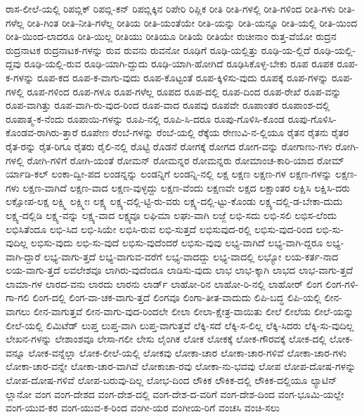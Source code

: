 {ರಾಸ-ಲೀಲೆ-ಯಲ್ಲಿ
ರಿಪಬ್ಲಿಕ್
ರಿಪಬ್ಲಿ-ಕನ್
ರಿಪಬ್ಲಿಕ್ಕಿನ
ರಿಪೇರಿ
ರಿಪ್ಲಿಕ
ರೀತಿ
ರೀತಿ-ಗಳಲ್ಲಿ
ರೀತಿ-ಗಳಿಂದ
ರೀತಿ-ಗಳು
ರೀತಿ-ಗಳೆಲ್ಲ
ರೀತಿ-ಗಿಂತ
ರೀತಿ-ನೀತಿ-ಗಳೆಲ್ಲ
ರೀತಿಯ
ರೀತಿ-ಯಂತೆಯೇ
ರೀತಿ-ಯನ್ನು
ರೀತಿ-ಯನ್ನೂ
ರೀತಿ-ಯಲ್ಲಿ
ರೀತಿ-ಯಿಂದ
ರೀತಿ-ಯಿಂದ-ಲಾದರೂ
ರೀತಿ-ಯಿಲ್ಲ
ರೀತಿಯು
ರೀತಿಯೂ
ರೀತಿಯೆ
ರೀತಿಯೇ
ರುಚೀನಾಂ
ರುತ್ತ-ವೆಯೋ
ರುದ್ರನ
ರುದ್ರನಾಟಕ
ರುದ್ರನಾಟಕ-ಗಳನ್ನು
ರುವ
ರುವನು
ರುವನೋ
ರೂಢಿಗೆ
ರೂಢಿ-ಯಲ್ಲಿತ್ತು
ರೂಢಿ-ಯ-ಲ್ಲಿದೆ
ರೂಢಿ-ಯಲ್ಲಿ-ದ್ದವು
ರೂಢಿ-ಯಲ್ಲಿ-ರುವ
ರೂಢಿ-ಯಾಗಿ-ದ್ದುದು
ರೂಢಿ-ಯಾಗಿ-ಹೋಗಿದೆ
ರೂಢಿಸಿಕೊಳ್ಳ-ಬೇಕು
ರೂಪ
ರೂಪಕ
ರೂಪ-ಕ-ಗಳನ್ನು
ರೂಪ-ಕದ
ರೂಪ-ಕ-ವಾಗು-ವುದು
ರೂಪ-ಕೊಟ್ಟಂತೆ
ರೂಪ-ಕ್ಕಿಳಿಸು-ವುದು
ರೂಪಕ್ಕೆ
ರೂಪ-ಗಳನ್ನು
ರೂಪ-ಗಳಲ್ಲಿ
ರೂಪ-ಗಳಿಂದ
ರೂಪ-ಗಳೂ
ರೂಪ-ಗಳೆಲ್ಲ
ರೂಪದ
ರೂಪ-ದಲ್ಲಿ
ರೂಪ-ದಿಂದ
ರೂಪ-ರೇಖೆ
ರೂಪ-ವನ್ನು
ರೂಪ-ವಾಗಿತ್ತು
ರೂಪ-ವಾಗಿ-ರು-ವುದ-ರಿಂದ
ರೂಪ-ವಾದ
ರೂಪವು
ರೂಪವೇ
ರೂಪಾಂತರ
ರೂಪಾಂಶ-ದಲ್ಲಿ
ರೂಪಾತ್ಮ-ಕ-ನೆಂದು
ರೂಪಾಯಿ-ಗಳನ್ನು
ರೂಪಿ-ನಲ್ಲಿ
ರೂಪಿ-ಸಿ-ದರೂ
ರೂಪು-ಗೊಳಿಸಿ-ಕೊಂಡ
ರೂಪು-ಗೊಳಿಸಿ-ಕೊಂಡವ-ರಾಗಿರು-ತ್ತಾರೆ
ರೂಪೇಣ
ರೆಂಬೆ-ಗಳನ್ನು
ರೆಂಬೆ-ಯಲ್ಲಿ
ರೆಕ್ಕೆಯ
ರೇಣುವಿ-ನ-ಲ್ಲಿಯೂ
ರೈತನ
ರೈತನು
ರೈತರ
ರೈತ-ರನ್ನು
ರೈತ-ರಿಗೂ
ರೈತರು
ರೈಲಿ-ನಲ್ಲಿ
ರೊಟ್ಟಿ
ರೊಡನೆ
ರೋಗಕ್ಕೆ
ರೋಗದ
ರೋಗ-ವನ್ನು
ರೋಗಾಣು-ಗಳು
ರೋಗಿ-ಗಳಲ್ಲಿ
ರೋಗಿ-ಗಳಿಗೆ
ರೋಗಿ-ಯಂತೆ
ರೋಮನ್
ರೋಮನ್ನರ
ರೋಮನ್ನರು
ರೋಮಾಂಚ-ಕಾರಿ-ಯಾದ
ರೋಮ್
ರ್ಯಾಡಿ-ಕಲ್
ಲಂಕಾ-ದ್ವೀ-ಪದ
ಲಂಡನ್ನನ್ನು
ಲಂಡನ್ನಿಗೆ
ಲಂಡನ್ನಿ-ನಲ್ಲಿ
ಲಕ್ಷ
ಲಕ್ಷಣ
ಲಕ್ಷಣ-ಗಳ
ಲಕ್ಷಣ-ಗಳನ್ನು
ಲಕ್ಷಣ-ಗಳು
ಲಕ್ಷಣ-ವಾಗಿದೆ
ಲಕ್ಷಣ-ವಾದ
ಲಕ್ಷಣ-ವುಳ್ಳದ್ದು
ಲಕ್ಷಣ-ವೆಂದು
ಲಕ್ಷಣವೇ
ಲಕ್ಷದ
ಲಕ್ಷಾಂತರ
ಲಕ್ಷಿಸಿ
ಲಕ್ಷಿಸಿ-ದರು
ಲಕ್ಷೋಪ-ಲಕ್ಷ
ಲಕ್ಷ್ಮಿ
ಲಕ್ಷ್ಮೀಃ
ಲಕ್ಷ್ಯ
ಲಕ್ಷ್ಯ-ದಲ್ಲಿ-ಟ್ಟಿ-ರು-ವರು
ಲಕ್ಷ್ಯ-ದಲ್ಲಿ-ಟ್ಟು-ಕೊಂಡು
ಲಕ್ಷ್ಯ-ದಲ್ಲಿ-ಡ-ಬೇಕಾ-ದುದು
ಲಕ್ಷ್ಯ-ದಲ್ಲಿಡಿ
ಲಕ್ಷ್ಯ-ವನ್ನು
ಲಕ್ಷ್ಯ-ವಾದ
ಲಕ್ಷ್ಯವೂ
ಲಘಿಮಾ
ಲಘು-ವಾಗಿ
ಲಜ್ಜೆ
ಲಭಿ-ಸದು
ಲಭಿ-ಸಲಿ
ಲಭಿಸ-ಲೆಂದು
ಲಭಿಸಿತೆಂದೂ
ಲಭಿ-ಸಿದ
ಲಭಿ-ಸಿಯೇ
ಲಭಿಸಿ-ರುವ
ಲಭಿ-ಸುತ್ತದೆ
ಲಭಿಸುವುದ-ರಲ್ಲಿ
ಲಭಿಸು-ವುದ-ರಿಂದ
ಲಭಿ-ಸು-ವುದಿಲ್ಲ
ಲಭಿಸು-ವುದು
ಲಭಿ-ಸು-ವುದೆ
ಲಭಿಸು-ವುದೆಂದರೆ
ಲಭಿಸು-ವುವು
ಲಭ್ಯ-ವಾಗಿದೆ
ಲಭ್ಯ-ವಾಗಿ-ದ್ದರೂ
ಲಭ್ಯ-ವಾಗಿ-ದ್ದಾರೆ
ಲಭ್ಯ-ವಾಗು-ತ್ತದೆ
ಲಭ್ಯ-ವಾಗುವ-ವರೆಗೆ
ಲಭ್ಯ-ವಾದದ್ದು
ಲಭ್ಯ-ವಾದಲ್ಲಿ
ಲಭ್ಯೋ
ಲಯ-ಕರ್ತ-ನಾದ
ಲಯ-ವಾಗು-ತ್ತದೆ
ಲವಲೇಶವೂ
ಲಾಗಿರು-ವುದೆಂದೂ
ಲಾಡಿಸು-ವುದು
ಲಾಭ
ಲಾಭ-ಕ್ಕಾಗಿ
ಲಾಭದ
ಲಾಭ-ವಾಗು-ತ್ತದೆ
ಲಾಮಾ-ಗಳ
ಲಾರದ-ವನು
ಲಾರದು
ಲಾರನು
ಲಾರ್ಡ್
ಲಾಹೋ-ರಿನ
ಲಾಹೋ-ರಿ-ನಲ್ಲಿ
ಲಾಹೋರ್
ಲಿಂಗ
ಲಿಂಗ-ಗಳಿ-ಗಾ-ಗಲಿ
ಲಿಂಗ-ದಲ್ಲಿ
ಲಿಂಗ-ವಾ-ಚಕ-ವಾಗು-ತ್ತದೆ
ಲಿಂಗವೂ
ಲಿಂಗಾ-ತೀತ-ವಾದುದು
ಲಿಪಿ-ಬದ್ಧ
ಲಿಪಿ-ಯಲ್ಲಿ
ಲೀನ-ವಾಗಲು
ಲೀನ-ವಾಗುತ್ತವೆ
ಲೀನ-ವಾಗು-ವುದ-ರಿಂದಲೇ
ಲೀಲಾ
ಲೀಲಾ-ಕ್ಷೇತ್ರ-ವಾಯಿತು
ಲೀಲೆ
ಲೀಲೆಯ
ಲೀಲೆ-ಯನ್ನು
ಲೀಲೆ-ಯಲ್ಲಿ
ಲಿಮಿಟೆಡ್
ಲುಪ್ತ
ಲುಪ್ತ-ವಾಗಿ
ಲುಪ್ತ-ವಾಗುತ್ತವೆ
ಲೆಕ್ಕಿ-ಸದೆ
ಲೆಕ್ಕಿ-ಸ-ಲಿಲ್ಲ
ಲೆಕ್ಕಿ-ಸಿದರು
ಲೆಕ್ಕಿ-ಸು-ವುದಿಲ್ಲ
ಲೇಖನ-ಗಳನ್ನು
ಲೇಶಾಂಶವೂ
ಲೇಸಾ-ಗಲೀ
ಲೇಸು
ಲೈಂಗಿಕ
ಲೋಕ
ಲೋಕಕ್ಕೆ
ಲೋಕ-ಗೌರವಕ್ಕೆ
ಲೋಕ-ದಲ್ಲಿ
ಲೋಕ-ವನ್ನೂ
ಲೋಕ-ವನ್ನೆಲ್ಲಾ
ಲೋಕ-ಲೀಲೆ-ಯಲ್ಲಿ
ಲೋಕವು
ಲೋಕಾ-ಚಾರ
ಲೋಕಾ-ಚಾರ-ಗಳಿವೆ
ಲೋಕಾ-ಚಾರ-ಗಳು
ಲೋಕಾ-ಚಾರ-ವನ್ನೇ
ಲೋಕಾ-ಚಾರ-ವಾಗಿವೆ
ಲೋಕಾಚಾ-ರವು
ಲೋಕಾ-ನು-ಭವವು
ಲೋಪ
ಲೋಪ-ದೋಷ-ಗಳನ್ನು
ಲೋಪ-ದೋಷ-ಗಳಿವೆ
ಲೋಪ-ಬರುವು-ದಿಲ್ಲ
ಲೋಭ-ದಿಂದ
ಲೌಕಿಕ
ಲೌಕಿಕ-ದಲ್ಲಿ
ಲೌಕಿಕ-ದಲ್ಲಿಯೂ
ಲ್ಯಾಟಿನ್
ಲ್ಲಾನೋ
ವಂಗ
ವಂಗ-ದೇಶದ
ವಂಗ-ದೇಶ-ದಲ್ಲಿ
ವಂಗ-ದೇಶ-ದ-ವರಿಗೆ
ವಂಗ-ದೇಶ-ದಿಂದ
ವಂಗ-ಭೂಮಿ-ಯಲ್ಲೇ
ವಂಗ-ಯುವ-ಕರ
ವಂಗ-ಯುವ-ಕ-ರಿಂದ
ವಂಗೀ-ಯರ
ವಂಗೀಯ-ರಿಗೆ
ವಂಚಸಿ
ವಂಚಿ-ಸಲು
}
